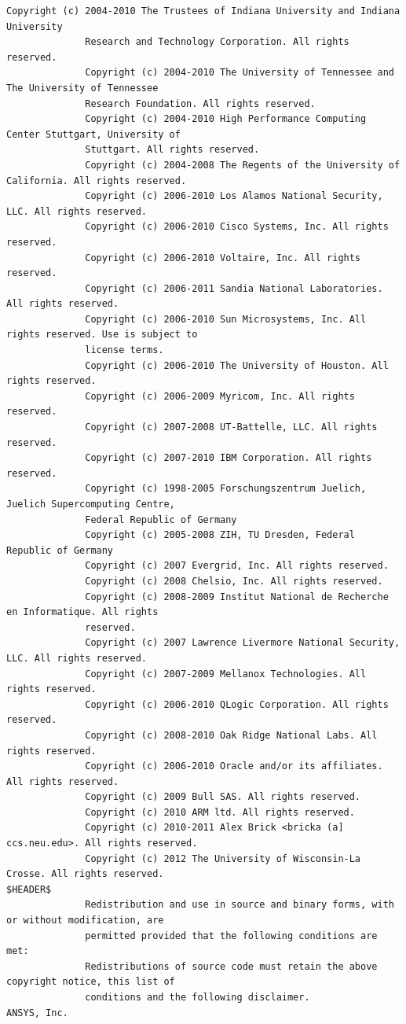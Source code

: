 \begin{lstlisting}[basicstyle=\ttfamily\scriptsize,breaklines=true]
Copyright (c) 2004-2010 The Trustees of Indiana University and Indiana University
              Research and Technology Corporation. All rights reserved.
              Copyright (c) 2004-2010 The University of Tennessee and The University of Tennessee
              Research Foundation. All rights reserved.
              Copyright (c) 2004-2010 High Performance Computing Center Stuttgart, University of
              Stuttgart. All rights reserved.
              Copyright (c) 2004-2008 The Regents of the University of California. All rights reserved.
              Copyright (c) 2006-2010 Los Alamos National Security, LLC. All rights reserved.
              Copyright (c) 2006-2010 Cisco Systems, Inc. All rights reserved.
              Copyright (c) 2006-2010 Voltaire, Inc. All rights reserved.
              Copyright (c) 2006-2011 Sandia National Laboratories. All rights reserved.
              Copyright (c) 2006-2010 Sun Microsystems, Inc. All rights reserved. Use is subject to
              license terms.
              Copyright (c) 2006-2010 The University of Houston. All rights reserved.
              Copyright (c) 2006-2009 Myricom, Inc. All rights reserved.
              Copyright (c) 2007-2008 UT-Battelle, LLC. All rights reserved.
              Copyright (c) 2007-2010 IBM Corporation. All rights reserved.
              Copyright (c) 1998-2005 Forschungszentrum Juelich, Juelich Supercomputing Centre,
              Federal Republic of Germany
              Copyright (c) 2005-2008 ZIH, TU Dresden, Federal Republic of Germany
              Copyright (c) 2007 Evergrid, Inc. All rights reserved.
              Copyright (c) 2008 Chelsio, Inc. All rights reserved.
              Copyright (c) 2008-2009 Institut National de Recherche en Informatique. All rights
              reserved.
              Copyright (c) 2007 Lawrence Livermore National Security, LLC. All rights reserved.
              Copyright (c) 2007-2009 Mellanox Technologies. All rights reserved.
              Copyright (c) 2006-2010 QLogic Corporation. All rights reserved.
              Copyright (c) 2008-2010 Oak Ridge National Labs. All rights reserved.
              Copyright (c) 2006-2010 Oracle and/or its affiliates. All rights reserved.
              Copyright (c) 2009 Bull SAS. All rights reserved.
              Copyright (c) 2010 ARM ltd. All rights reserved.
              Copyright (c) 2010-2011 Alex Brick <bricka (a] ccs.neu.edu>. All rights reserved.
              Copyright (c) 2012 The University of Wisconsin-La Crosse. All rights reserved.
$HEADER$
              Redistribution and use in source and binary forms, with or without modification, are
              permitted provided that the following conditions are met:
              Redistributions of source code must retain the above copyright notice, this list of
              conditions and the following disclaimer.
ANSYS, Inc.


\end{lstlisting}
